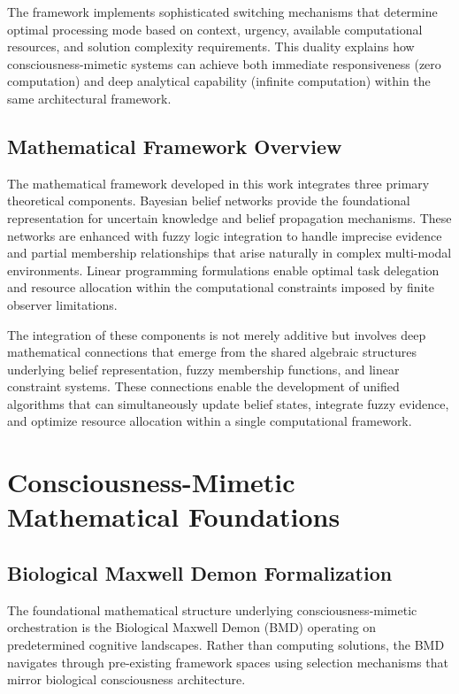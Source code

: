 \documentclass[12pt,a4paper]{article}
\begin{document}
The framework implements sophisticated switching mechanisms that determine optimal processing mode based on context, urgency, available computational resources, and solution complexity requirements. This duality explains how consciousness-mimetic systems can achieve both immediate responsiveness (zero computation) and deep analytical capability (infinite computation) within the same architectural framework.

\subsection{Mathematical Framework Overview}

The mathematical framework developed in this work integrates three primary theoretical components. Bayesian belief networks provide the foundational representation for uncertain knowledge and belief propagation mechanisms. These networks are enhanced with fuzzy logic integration to handle imprecise evidence and partial membership relationships that arise naturally in complex multi-modal environments. Linear programming formulations enable optimal task delegation and resource allocation within the computational constraints imposed by finite observer limitations.

The integration of these components is not merely additive but involves deep mathematical connections that emerge from the shared algebraic structures underlying belief representation, fuzzy membership functions, and linear constraint systems. These connections enable the development of unified algorithms that can simultaneously update belief states, integrate fuzzy evidence, and optimize resource allocation within a single computational framework.

\section{Consciousness-Mimetic Mathematical Foundations}

\subsection{Biological Maxwell Demon Formalization}

The foundational mathematical structure underlying consciousness-mimetic orchestration is the Biological Maxwell Demon (BMD) operating on predetermined cognitive landscapes. Rather than computing solutions, the BMD navigates through pre-existing framework spaces using selection mechanisms that mirror biological consciousness architecture.
\end{document}

